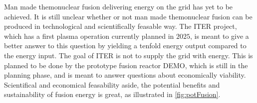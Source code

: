 Man made themonuclear fusion delivering energy on the grid has yet to be achieved.
It is still unclear whether or not man made themonuclear fusion can be produced in technological and scientifically feasable way.
The ITER \cite{ITERWeb} project, which has a first plasma operation currently planned in $2025$, is meant to give a better answer to this question by yielding a tenfold energy output compared to the energy input.
The goal of ITER is not to supply the grid with energy.
This is planned to be done by the prototype fusion reactor DEMO, which is still in the planning phase, and is meant to answer questions about economically viability.
Scientifical and economical feasability aside, the potential benefits and sustainability of fusion energy is great, as illustrated in \cref{fig:potFusion}.
%
